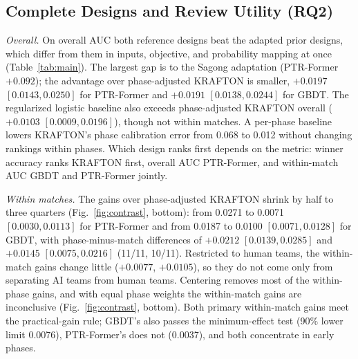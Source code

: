\documentclass[sigconf,anonymous]{acmart}
\begin{document}
\subsection{Complete Designs and Review Utility (RQ2)}
\label{sec:results:designs}

\emph{Overall.} On overall AUC both reference designs beat the adapted prior designs, which differ from them in inputs, objective, and probability mapping at once (Table~\ref{tab:main}). The largest gap is to the Sagong adaptation (PTR-Former $+0.092$); the advantage over phase-adjusted KRAFTON is smaller, $+0.0197$ $[0.0143,\allowbreak 0.0250]$ for PTR-Former and $+0.0191$ $[0.0138,\allowbreak 0.0244]$ for GBDT. The regularized logistic baseline also exceeds phase-adjusted KRAFTON overall ($+0.0103$ $[0.0009,\allowbreak 0.0196]$), though not within matches. A per-phase baseline lowers KRAFTON's phase calibration error from 0.068 to 0.012 without changing rankings within phases. Which design ranks first depends on the metric: winner accuracy ranks KRAFTON first, overall AUC PTR-Former, and within-match AUC GBDT and PTR-Former jointly.

\emph{Within matches.} The gains over phase-adjusted KRAFTON shrink by half to three quarters (Fig.~\ref{fig:contrast}, bottom): from 0.0271 to 0.0071 $[0.0030,\allowbreak 0.0113]$ for PTR-Former and from 0.0187 to 0.0100 $[0.0071,\allowbreak 0.0128]$ for GBDT, with phase-minus-match differences of $+0.0212$ $[0.0139,\allowbreak 0.0285]$ and $+0.0145$ $[0.0075,\allowbreak 0.0216]$ (11/11, 10/11). Restricted to human teams, the within-match gains change little ($+0.0077$, $+0.0105$), so they do not come only from separating AI teams from human teams. Centering removes most of the within-phase gains, and with equal phase weights the within-match gains are inconclusive (Fig.~\ref{fig:contrast}, bottom). Both primary within-match gains meet the practical-gain rule; GBDT's also passes the minimum-effect test (90\% lower limit 0.0076), PTR-Former's does not (0.0037), and both concentrate in early phases.
\end{document}
